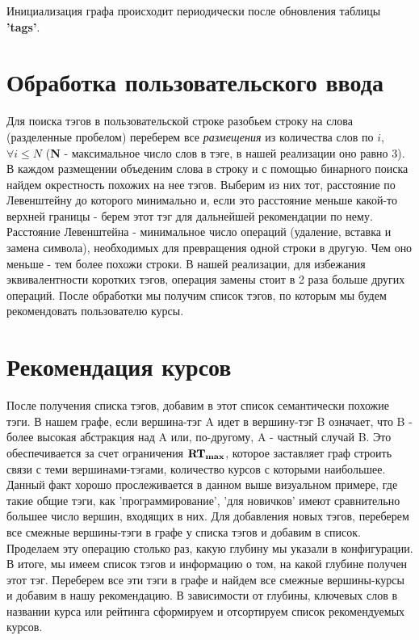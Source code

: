 \documentclass[12pt]{article}
\begin{document}
\noindent Инициализация графа происходит периодически после обновления таблицы \textbf{'tags'}.

\section*{Обработка пользовательского ввода}
Для поиска тэгов в пользовательской строке разобьем строку на слова (разделенные пробелом) переберем все \textit{размещения} из количества слов по $i$, $\forall i \leq N$ (\textbf{N} - максимальное число слов в тэге, в нашей реализации оно равно $3$). \newline
В каждом размещении объеденим слова в строку и с помощью бинарного поиска найдем окрестность похожих на нее тэгов. Выберим из них тот, расстояние по Левенштейну до которого минимально и, если это расстояние меньше какой-то верхней границы - берем этот тэг для дальнейшей рекомендации по нему. \newline
Расстояние Левенштейна - минимальное число операций (удаление, вставка и замена символа), необходимых для превращения одной строки в другую. Чем оно меньше - тем более похожи строки. В нашей реализации, для избежания эквивалентности коротких тэгов, операция замены стоит в 2 раза больше других операций. \newline
После обработки мы получим список тэгов, по которым мы будем рекомендовать пользователю курсы. \newline

\section*{Рекомендация курсов}
После получения списка тэгов, добавим в этот список семантически похожие тэги. \newline
В нашем графе, если вершина-тэг A идет в вершину-тэг B означает, что B - более высокая абстракция над A или, по-другому, A - частный случай B. \newline
Это обеспечивается за счет ограничения $\bf{RT_{max}}$, которое заставляет граф строить связи с теми вершинами-тэгами, количество курсов с которыми наибольшее. \newline
Данный факт хорошо прослеживается в данном выше визуальном примере, где такие общие тэги, как 'программирование', 'для новичков' имеют сравнительно большее число вершин, входящих в них. \newline
Для добавления новых тэгов, переберем все смежные вершины-тэги в графе у списка тэгов и добавим в список. Проделаем эту операцию столько раз, какую глубину мы указали в конфигурации. \newline
В итоге, мы имеем список тэгов и информацию о том, на какой глубине получен этот тэг. Переберем все эти тэги в графе и найдем все смежные вершины-курсы и добавим в нашу рекомендацию. В зависимости от глубины, ключевых слов в названии курса или рейтинга сформируем и отсортируем список рекомендуемых курсов.
\end{document}
